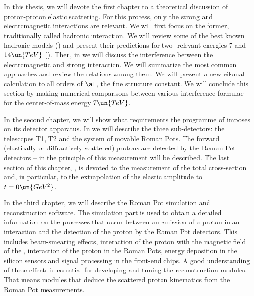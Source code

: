 


In this thesis, we will devote the first chapter to a theoretical discussion of proton-proton elastic scattering. For this process, only the strong and electromagnetic interactions are relevant. We will first focus on the former, traditionally called hadronic interaction. We will review some of the best known hadronic models () and present their predictions for two -relevant energies $7$ and $14\un{TeV}$ (). Then, in  we will discuss the interference between the electromagnetic and strong interaction. We will summarize the most common approaches and review the relations among them. We will present a new eikonal calculation to all orders of $\al$, the fine structure constant. We will conclude this section by making numerical comparisons between various interference formulae for the center-of-mass energy $7\un{TeV}$.

In the second chapter, we will show what requirements the programme of  imposes on its detector apparatus. In  we will describe the three sub-detectors: the telescopes T1, T2 and the system of movable Roman Pots. The forward (elastically or diffractively scattered) protons are detected by the Roman Pot detectors -- in  the principle of this measurement will be described. The last section of this chapter, , is devoted to the measurement of the total cross-section and, in particular, to the extrapolation of the elastic amplitude to $t=0\un{GeV^2}$.

In the third chapter, we will describe the Roman Pot simulation and reconstruction software. The simulation part is used to obtain a detailed information on the processes that occur between an emission of a proton in an interaction and the detection of the proton by the Roman Pot detectors. This includes beam-smearing effects, interaction of the proton with the magnetic field of the , interaction of the proton in the Roman Pots, energy deposition in the silicon sensors and signal processing in the front-end chips. A good understanding of these effects is essential for developing and tuning the reconstruction modules. That means modules that deduce the scattered proton kinematics from the Roman Pot measurements.

